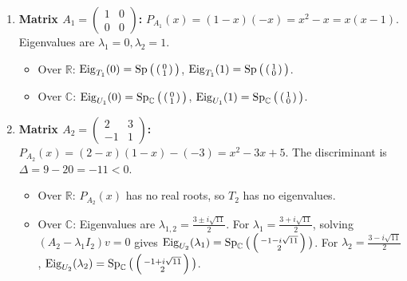 \begin{exercisesolution*}
\label{sol:eigenvalues_eigenspaces_R_vs_C}
\begin{enumerate}[label=\textbf{(\alph*)}]
    \item \textbf{Matrix $A_1 = \left(\begin{smallmatrix} 1 & 0 \\ 0 & 0 \end{smallmatrix}\right)$:}
    $P_{A_1}(x) = (1-x)(-x) = x^2 - x = x(x-1)$.
    Eigenvalues are $\lambda_1 = 0, \lambda_2 = 1$.
    \begin{itemize}
        \item Over $\mathbb{R}$: $\operatorname{Eig}_{T_1}(0) = \operatorname{Sp}\big(\left(\begin{smallmatrix} 0 \\ 1 \end{smallmatrix}\right)\big)$, $\operatorname{Eig}_{T_1}(1) = \operatorname{Sp}\big(\left(\begin{smallmatrix} 1 \\ 0 \end{smallmatrix}\right)\big)$.
        \item Over $\mathbb{C}$: $\operatorname{Eig}_{U_1}(0) = \operatorname{Sp}_\mathbb{C}\big(\left(\begin{smallmatrix} 0 \\ 1 \end{smallmatrix}\right)\big)$, $\operatorname{Eig}_{U_1}(1) = \operatorname{Sp}_\mathbb{C}\big(\left(\begin{smallmatrix} 1 \\ 0 \end{smallmatrix}\right)\big)$.
    \end{itemize}

    \item \textbf{Matrix $A_2 = \left(\begin{smallmatrix} 2 & 3 \\ -1 & 1 \end{smallmatrix}\right)$:}
    $P_{A_2}(x) = (2-x)(1-x) - (-3) = x^2 - 3x + 5$.
    The discriminant is $\Delta = 9 - 20 = -11 < 0$.
    \begin{itemize}
        \item Over $\mathbb{R}$: $P_{A_2}(x)$ has no real roots, so $T_2$ has no eigenvalues.
        \item Over $\mathbb{C}$: Eigenvalues are $\lambda_{1,2} = \frac{3 \pm i\sqrt{11}}{2}$.
        For $\lambda_1 = \frac{3+i\sqrt{11}}{2}$, solving $(A_2 - \lambda_1 I_2)v = 0$ gives $\operatorname{Eig}_{U_2}(\lambda_1) = \operatorname{Sp}_\mathbb{C}\big(\left(\begin{smallmatrix} -1-i\sqrt{11} \\ 2 \end{smallmatrix}\right)\big)$.
        For $\lambda_2 = \frac{3-i\sqrt{11}}{2}$, $\operatorname{Eig}_{U_2}(\lambda_2) = \operatorname{Sp}_\mathbb{C}\big(\left(\begin{smallmatrix} -1+i\sqrt{11} \\ 2 \end{smallmatrix}\right)\big)$.
    \end{itemize}


\end{enumerate}
\end{exercisesolution*}
